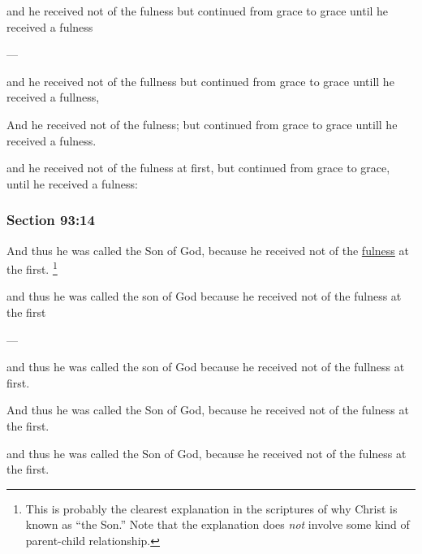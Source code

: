 		\begin{framed}
		\scriptsize
			\begin{compactdesc}
				\item[JSP] and he received not of the fulness but continued from grace to grace until he received a fulness
				\item[BC] ---
				\item[RB2] and he received not of the fullness but continued from grace to grace untill he received a fullness, 
				\item[RB1] And he received not of the fulness; but continued from grace to grace untill he received a fulness.
				\item[DC 1835] and he received not of the fulness at first, but continued from grace to grace, until he received a fulness: 
			\end{compactdesc}
		\end{framed}

	\subsubsection{Section 93:14} %
		\label{DC93-14}

		And thus he was called the Son of God, because he received not of the \hyperref[FULNESS]{fulness} at the first.%
			\footnote{%
				This is probably the clearest explanation in the scriptures of why Christ is known as ``the Son.'' Note that the explanation does \textit{not} involve some kind of parent-child relationship.
				}

		\begin{framed}
		\scriptsize
			\begin{compactdesc}
				\item[JSP] and thus he was called the son of God because he received not of the fulness at the first
				\item[BC] ---
				\item[RB2] and thus he was called the son of God because he received not of the fullness at first. 
				\item[RB1] [paragraph break] And thus he was called the Son of God, because he received not of the fulness at the first. 
				\item[DC 1835] and thus he was called the Son of God, because he received not of the fulness at the first. 
			\end{compactdesc}
		\end{framed}

